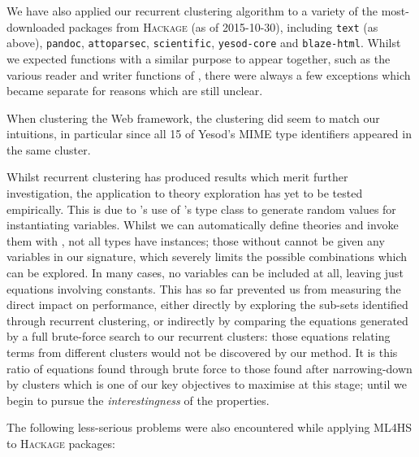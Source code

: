 We have also applied our recurrent clustering algorithm to a variety of the most-downloaded packages from \textsc{Hackage} (as of 2015-10-30), including \texttt{text} (as above), \texttt{pandoc}, \texttt{attoparsec}, \texttt{scientific}, \texttt{yesod-core} and \texttt{blaze-html}. Whilst we expected functions with a similar purpose to appear together, such as the various reader and writer functions of , there were always a few exceptions which became separate for reasons which are still unclear.

When clustering the  Web framework, the clustering did seem to match our intuitions, in particular since all 15 of Yesod's MIME type identifiers appeared in the same cluster.

Whilst recurrent clustering has produced results which merit further investigation, the application to theory exploration has yet to be tested empirically. This is due to \qspec{}'s use of \qcheck{}'s  type class to generate random values for instantiating variables. Whilst we can automatically define \qspec{} theories and invoke them with , not all types have  instances; those without cannot be given any variables in our signature, which severely limits the possible combinations which can be explored. In many cases, no variables can be included at all, leaving just equations involving constants. This has so far prevented us from measuring the direct impact on \qspec{} performance, either directly by exploring the sub-sets identified through recurrent clustering, or indirectly by comparing the equations generated by a full brute-force search to our recurrent clusters: those equations relating terms from different clusters would not be discovered by our method. It is this ratio of equations found through brute force to those found after narrowing-down by clusters which is one of our key objectives to maximise at this stage; until we begin to pursue the \emph{interestingness} of the properties.

The following less-serious problems were also encountered while applying \textsc{ML4HS} to \textsc{Hackage} packages:

